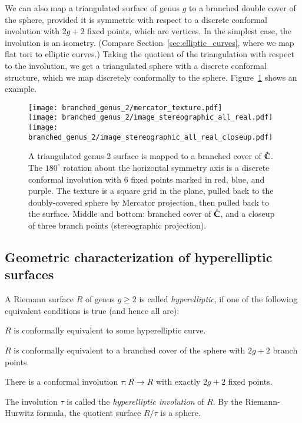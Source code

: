 \documentclass[Thesis]{subfiles}
\begin{document}
 We
can also map a triangulated surface of genus $g$ to a branched double
cover of the sphere, provided it is symmetric with respect to a
discrete conformal involution with $2g+2$ fixed points, which are
vertices. In the simplest case, the involution is an
isometry. (Compare Section~\ref{sec:elliptic_curves}, where we map
flat tori to elliptic curves.) Taking the quotient of the triangulation
with respect to the involution, we get a triangulated sphere with a
discrete conformal structure, which we map discretely conformally to
the sphere.  Figure~\ref{fig:genus2_branched} shows an example.
\begin{figure} 
\centering
\texttt{[image: branched\_genus\_2/mercator\_texture.pdf]}\\
\texttt{[image: branched\_genus\_2/image\_stereographic\_all\_real.pdf]}\\
\vspace{1mm}
\texttt{[image: branched\_genus\_2/image\_stereographic\_all\_real\_closeup.pdf]}
\caption{A triangulated genus-$2$ surface is mapped to a branched
  cover of $\hat{\mathbb C}$. The $180^{\circ}$ rotation about the horizontal
  symmetry axis is a discrete conformal involution with $6$ fixed
  points marked in red, blue, and purple. The texture is a
  square grid in the plane, pulled back to the doubly-covered sphere
  by Mercator projection, then pulled back to the surface. Middle and bottom:
  branched cover of $\hat{\mathbb C}$, and a closeup of three branch points (stereographic projection).}
\label{fig:genus2_branched} 
\end{figure}

\goodbreak
\subsection{Geometric characterization of hyperelliptic surfaces}
\label{sec:hyperelliptic_domain}

A Riemann surface $R$ of genus $g\geq 2$ is called \emph{hyperelliptic},
if one of the following equivalent conditions is true (and hence all are):
\begin{compactenum}[(i)]
\item $R$ is conformally equivalent to some hyperelliptic curve.
\item $R$ is conformally equivalent to a branched cover of the sphere
  with $2g+2$ branch points.
\item There is a conformal involution $\tau:R\rightarrow R$ with
  exactly $2g+2$ fixed points. 
\end{compactenum}
The involution $\tau$ is called the \emph{hyperelliptic involution} of
$R$. By the Riemann-Hurwitz formula, the quotient surface $R/\tau$ is a
sphere. 
\end{document}
